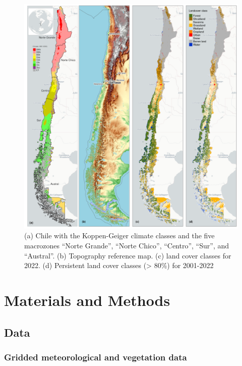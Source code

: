 \documentclass[
  authoryear,
  preprint,
  3p,
  onecolumn]{elsarticle}
\begin{document}
\begin{figure}[!ht]

{\centering \includegraphics{../output/figs/map_study_con_landcover.png}

}

\caption{\label{fig-studyArea}(a) Chile with the Koppen-Geiger climate
classes and the five macrozones ``Norte Grande'', ``Norte Chico'',
``Centro'', ``Sur'', and ``Austral''. (b) Topography reference map. (c)
land cover classes for 2022. (d) Persistent land cover classes
(\textgreater{} 80\%) for 2001-2022}

\end{figure}

\hypertarget{materials-and-methods}{%
\section{Materials and Methods}\label{materials-and-methods}}

\hypertarget{data}{%
\subsection{Data}\label{data}}

\hypertarget{gridded-meteorological-and-vegetation-data}{%
\subsubsection{Gridded meteorological and vegetation
data}\label{gridded-meteorological-and-vegetation-data}}
\end{document}
